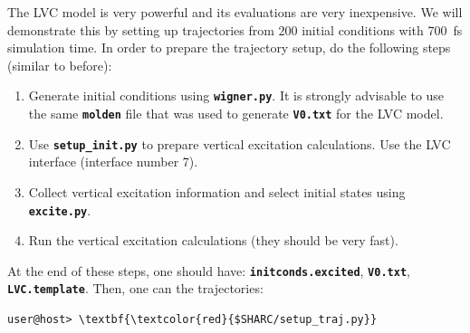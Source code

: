\documentclass[a4paper,11pt,DIV=15,openany]{scrbook}
\newcommand{\ttt}[1]{\textbf{\texttt{#1}}}
\begin{document}
The LVC model is very powerful and its evaluations are very inexpensive.
We will demonstrate this by setting up trajectories from 200 initial conditions with 700~fs simulation time.
In order to prepare the trajectory setup, do the following steps (similar to before):
\begin{enumerate}
  \item Generate initial conditions using \ttt{wigner.py}. It is strongly advisable to use the same \ttt{molden} file that was used to generate \ttt{V0.txt} for the LVC model.
  \item Use \ttt{setup\_init.py} to prepare vertical excitation calculations. Use the LVC interface (interface number 7). 
  \item Collect vertical excitation information and select initial states using \ttt{excite.py}.
  \item Run the vertical excitation calculations (they should be very fast).
\end{enumerate}
At the end of these steps, one should have: \ttt{initconds.excited}, \ttt{V0.txt}, \ttt{LVC.template}.
Then, one can the trajectories:
\begin{Verbatim}[commandchars=\\\{\}]
user@host> \textbf{\textcolor{red}{$SHARC/setup_traj.py}}
\end{Verbatim}
\end{document}
